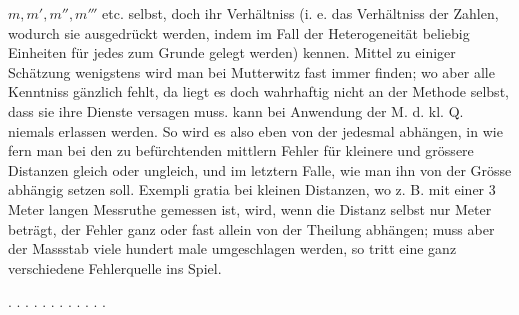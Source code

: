 $m, m', m'', m'''$ etc. selbst, doch ihr Verhältniss (i. e. das Verhältniss der Zahlen,
wodurch sie ausgedrückt werden, indem im Fall der Heterogeneität beliebig Einheiten für
jedes zum Grunde gelegt werden) kennen. Mittel zu einiger Schätzung wenigstens wird man bei
Mutterwitz fast immer finden; wo aber alle Kenntniss gänzlich fehlt, da liegt es doch
wahrhaftig nicht an der Methode selbst, dass sie ihre Dienste versagen muss. 
kann bei Anwendung der M. d. kl. Q. niemals erlassen werden. So wird es also eben von der
 jedesmal abhängen, in wie fern man bei  den zu befürchtenden
mittlern Fehler für kleinere und grössere Distanzen gleich oder ungleich, und im letztern
Falle, wie man ihn von der Grösse abhängig setzen soll. Exempli gratia bei kleinen
Distanzen, wo z. B. mit einer 3 Meter langen Messruthe gemessen ist, wird, wenn die Distanz
selbst nur  Meter beträgt, der Fehler ganz oder fast allein von der Theilung
abhängen; muss aber der Massstab viele hundert male umgeschlagen werden, so tritt eine ganz
verschiedene Fehlerquelle ins Spiel.

\begin{center}
. . . . . . . . . . . .
\end{center}
